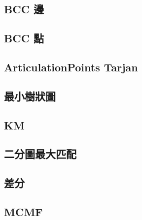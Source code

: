     \subsection{BCC 邊}
    \subsection{BCC 點}
    \subsection{ArticulationPoints Tarjan}
    \subsection{最小樹狀圖}
    \subsection{KM}
        
    \subsection{二分圖最大匹配}
        
    \subsection{差分}
    \subsection{MCMF}
